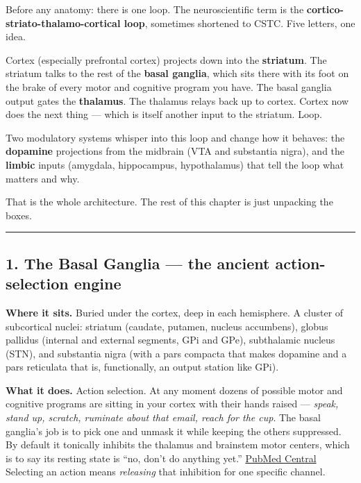Before any anatomy: there is one loop. The neuroscientific term is the \textbf{cortico-striato-thalamo-cortical loop}, sometimes shortened to CSTC. Five letters, one idea.

Cortex (especially prefrontal cortex) projects down into the \textbf{striatum}. The striatum talks to the rest of the \textbf{basal ganglia}, which sits there with its foot on the brake of every motor and cognitive program you have. The basal ganglia output gates the \textbf{thalamus}. The thalamus relays back up to cortex. Cortex now does the next thing --- which is itself another input to the striatum. Loop.

Two modulatory systems whisper into this loop and change how it behaves: the \textbf{dopamine} projections from the midbrain (VTA and substantia nigra), and the \textbf{limbic} inputs (amygdala, hippocampus, hypothalamus) that tell the loop what matters and why.

That is the whole architecture. The rest of this chapter is just unpacking the boxes.

\begin{center}\rule{0.5\linewidth}{0.5pt}\end{center}

\subsection{1. The Basal Ganglia --- the ancient action-selection engine}\label{06_neurology_101-the-basal-ganglia-the-ancient-action-selection-engine}

\textbf{Where it sits.} Buried under the cortex, deep in each hemisphere. A cluster of subcortical nuclei: striatum (caudate, putamen, nucleus accumbens), globus pallidus (internal and external segments, GPi and GPe), subthalamic nucleus (STN), and substantia nigra (with a pars compacta that makes dopamine and a pars reticulata that is, functionally, an output station like GPi).

\textbf{What it does.} Action selection. At any moment dozens of possible motor and cognitive programs are sitting in your cortex with their hands raised --- \emph{speak, stand up, scratch, ruminate about that email, reach for the cup}. The basal ganglia's job is to pick one and unmask it while keeping the others suppressed. By default it tonically inhibits the thalamus and brainstem motor centers, which is to say its resting state is ``no, don't do anything yet.'' \href{https://pmc.ncbi.nlm.nih.gov/articles/PMC3853485/}{PubMed Central} Selecting an action means \emph{releasing} that inhibition for one specific channel.

